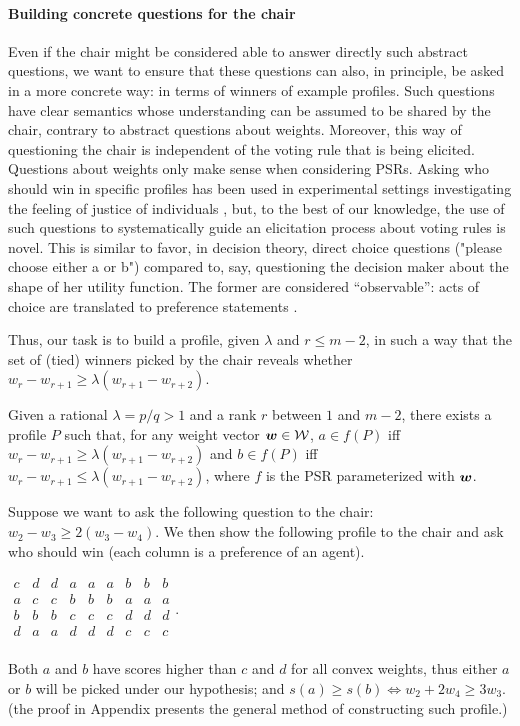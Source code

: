 \documentclass{article}
\begin{document}
\paragraph{Building concrete questions for the chair}
Even if the chair might be considered able to answer directly such abstract questions, we want to ensure that these questions can also, in principle, be asked in a more concrete way: in terms of winners of example profiles. Such questions have clear semantics whose understanding can be assumed to be shared by the chair, contrary to abstract questions about weights. 
Moreover, this way of questioning the chair is independent of the voting rule that is being elicited. Questions about weights only make sense when considering PSRs.
Asking who should win in specific profiles has been used in experimental settings investigating the feeling of justice of individuals \citep{Giritligil2005}, but, to the best of our knowledge, the use of such questions to systematically guide an elicitation process about voting rules is novel. 
This is similar to favor, in decision theory, direct choice questions ("please choose either a or b") compared to, say, questioning the decision maker about the shape of her utility function. The former are considered “observable”: acts of choice are translated to preference statements \citep[Ch.\ 1]{colell_microeconomic_1995}. 

Thus, our task is to build a profile, given $\lambda$ and $r ≤ m-2$, in such a way that the set of (tied) winners picked by the chair reveals whether $w_{r} - w_{r+1} \geq \lambda (w_{r+1} - w_{r+2})$.
\begin{proposition}\label{prop:chairQuestions}
	Given a rational $\lambda = p/q > 1$ and a rank $r$ between $1$ and $m - 2$, there exists a profile $P$ such that, for any weight vector $\bm{w} \in \mathcal{W}$, $a \in f(P)$ iff $w_{r} - w_{r+1} ≥ \lambda (w_{r+1} - w_{r+2})$ and $b \in f(P)$ iff $w_{r} - w_{r+1} ≤ \lambda (w_{r+1} - w_{r+2})$, where $f$ is the PSR parameterized with $\bm{w}$.
\end{proposition}

\begin{example*}
	Suppose we want to ask the following question to the chair: $w_{2} - w_{3} ≥ 2 (w_{3} - w_{4})$. 
	We then show the following profile to the chair and ask who should win (each column is a preference of an agent).
	\begin{center}
		$
		\begin{array}{ccccccccc}
			c&d&d&a&a&a&b&b&b\\
			a&c&c&b&b&b&a&a&a\\
			b&b&b&c&c&c&d&d&d\\
			d&a&a&d&d&d&c&c&c\\
		\end{array}.
		$
	\end{center}
	Both $a$ and $b$ have scores higher than $c$ and $d$ for all convex weights, thus either $a$ or $b$ will be picked under our hypothesis; and $s(a) ≥ s(b) ⇔ w_2 + 2 w_4 ≥ 3 w_3$.
	(the proof in Appendix presents the general method of constructing such profile.)
\end{example*}
\end{document}

